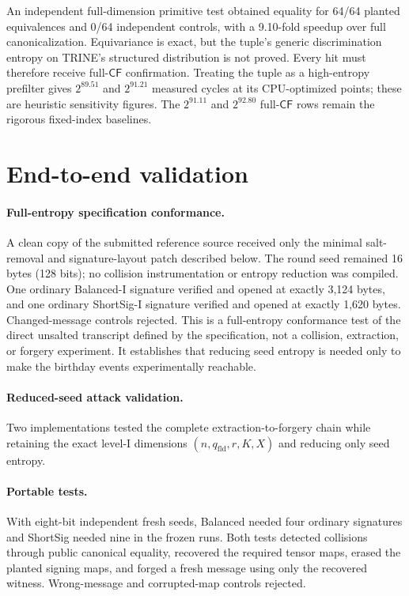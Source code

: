 \documentclass[11pt,a4paper]{article}
\newcommand{\CF}{\mathsf{CF}}
\newcommand{\qfld}{q_{\mathrm{fld}}}
\begin{document}
An independent full-dimension primitive test obtained equality for 64/64 planted
equivalences and 0/64 independent controls, with a 9.10-fold speedup over full
canonicalization.  Equivariance is exact, but the tuple's generic
discrimination entropy on TRINE's structured distribution is not proved.
Every hit must therefore receive full-$\CF$ confirmation.  Treating the tuple
as a high-entropy prefilter gives $2^{89.51}$ and $2^{91.21}$ measured cycles
at its CPU-optimized points; these are heuristic sensitivity figures.  The
$2^{91.11}$ and $2^{92.80}$ full-$\CF$ rows remain the rigorous fixed-index
baselines.

\section{End-to-end validation}

\paragraph{Full-entropy specification conformance.}
A clean copy of the submitted reference source received only the minimal
salt-removal and signature-layout patch described below.  The round seed
remained 16 bytes (128 bits); no collision instrumentation or entropy
reduction was compiled.  One ordinary Balanced-I signature verified and
opened at exactly 3,124 bytes, and one ordinary ShortSig-I signature verified
and opened at exactly 1,620 bytes.  Changed-message controls rejected.  This
is a full-entropy conformance test of the direct unsalted transcript defined by
the specification, not a collision, extraction, or forgery experiment.  It
establishes that reducing seed entropy is needed only to make the birthday
events experimentally reachable.

\paragraph{Reduced-seed attack validation.}
Two implementations tested the complete extraction-to-forgery chain while
retaining the exact level-I dimensions $(n,\qfld,r,K,X)$ and reducing only
seed entropy.

\paragraph{Portable tests.}
With eight-bit independent fresh seeds, Balanced needed four ordinary
signatures and ShortSig needed nine in the frozen runs.  Both tests detected
collisions through public canonical equality, recovered the required tensor
maps, erased the planted signing maps, and forged a fresh message using only
the recovered witness.  Wrong-message and corrupted-map controls rejected.
\end{document}
